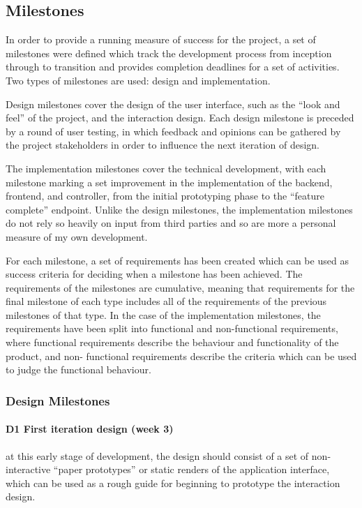 \documentclass[12pt,a4paper]{article}
\begin{document}
\subsection{Milestones}
In order to provide a running measure of success for the project, a set of
milestones were defined which track the development process from inception
through to transition and provides completion deadlines for a set of activities.
Two types of milestones are used: design and implementation.

Design milestones cover the design of the user interface, such as the “look and
feel” of the project, and the interaction design. Each design milestone is
preceded by a round of user testing, in which feedback and opinions can be
gathered by the project stakeholders in order to influence the next iteration of
design.

The implementation milestones cover the technical development, with each
milestone marking a set improvement in the implementation of the backend,
frontend, and controller, from the initial prototyping phase to the “feature
complete” endpoint. Unlike the design milestones, the implementation milestones
do not rely so heavily on input from third parties and so are more a personal
measure of my own development.

For each milestone, a set of requirements has been created which can be used as
success criteria for deciding when a milestone has been achieved. The
requirements of the milestones are cumulative, meaning that requirements for the
final milestone of each type includes all of the requirements of the previous
milestones of that type. In the case of the implementation milestones, the
requirements have been split into functional and non-functional requirements,
where functional requirements describe the behaviour and functionality of the
product, and non- functional requirements describe the criteria which can be
used to judge the functional behaviour.

\subsubsection{Design Milestones}

\paragraph{D1 First iteration design (week 3)} at this early stage of
development, the design should consist of a set of non-interactive “paper
prototypes” or static renders of the application interface, which can be used as
a rough guide for beginning to prototype the interaction design.
\end{document}
